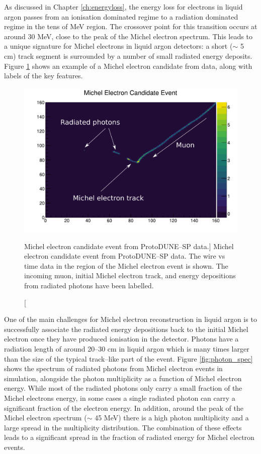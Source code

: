 As discussed in Chapter \ref{ch:energyloss}, the energy loss for electrons in
liquid argon passes from an ionisation dominated regime to a radiation dominated
regime in the tens of MeV region. The crossover point for this transition occurs
at around 30 MeV, close to the peak of the Michel electron spectrum. This
leads to a unique signature for Michel electrons in liquid argon detectors: a
short ($\sim$ 5 cm) track segment is surrounded by a number of small radiated 
energy deposits. Figure \ref{fig:michel_event} shows an example of a Michel 
electron candidate from \protodune{} data, along with labels of the key 
features.

\begin{figure}
	\centering
	\includegraphics[width=\textwidth]{figures/michel_candidate_labelled.pdf}
	\caption
	[Michel electron candidate event from ProtoDUNE--SP data.]
	{Michel electron candidate event from ProtoDUNE--SP data. The wire vs time
	data in the region of the Michel electron event is shown. The incoming muon,
	initial Michel electron track, and energy depositions from radiated photons
	have been labelled.}
	\label{fig:michel_event}
\end{figure}

One of the main challenges for Michel electron reconstruction in liquid argon is
to successfully associate the radiated energy depositions back to the initial
Michel electron once they have produced ionisation in the detector. Photons have
a radiation length of around 20--30 cm in liquid argon which is many times
larger than the size of the typical track--like part of the event. Figure 
\ref{fig:photon_spec} shows the spectrum of radiated photons from Michel 
electron events in \protodune{} simulation, alongside the photon multiplicity 
as a function of Michel electron energy. While most of the radiated photons 
only carry a small fraction of the Michel electrons energy, in some cases a 
single radiated photon can carry a significant fraction of the electron 
energy. In addition, around the peak of the Michel electron spectrum ($\sim$
45 MeV) there is a high photon multiplicity and a large spread in the
multiplicity distribution. The combination of these effects leads to a
significant spread in the fraction of radiated energy for Michel electron
events.


